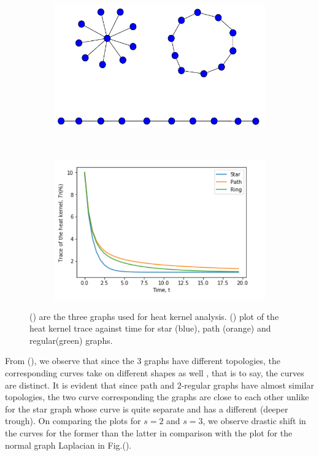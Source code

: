 \documentclass[10pt,a4paper]{article}
\begin{document}
        \begin{figure}[H]
        	\centering
        	\begin{subfigure}[b]{0.45\textwidth}
        		\includegraphics[width= \textwidth]{images/kernel-graphs.pdf}
        		\caption{}
        		\label{kernelgraphs}
        	\end{subfigure}~
        	\begin{subfigure}[b]{0.45\textwidth}
        		\includegraphics[width= \textwidth]{images/Trace-kernel-plot}
        		\caption{}
        		\label{plot-kernel}
        	\end{subfigure}
        	\caption{() are the three graphs used for heat kernel analysis. () plot of the heat kernel trace against time for star (blue), path (orange) and regular(green) graphs.}
        	\label{distinguishGraphs}
        \end{figure}
        From (), we observe that since the $3$ graphs have different topologies, the corresponding curves take on different shapes as well , that is to say, the curves are distinct. It is evident that since path and $2$-regular graphs have almost similar topologies, the two curve corresponding the graphs are close to each other unlike for the star graph whose  curve is quite separate and has a different (deeper trough). 
        On comparing the plots for $s=2$ and $s=3$, we observe drastic shift in the curves for the former than the latter in comparison with the plot for the normal graph Laplacian in Fig.().
        
\end{document}

